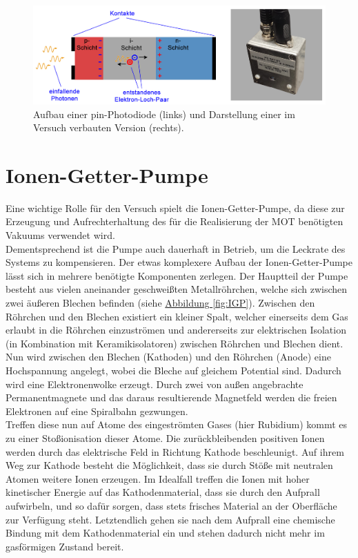 \documentclass[
class=book,
accentcolor=1b,
custommargins=geometry,
fontsize=11pt,
thesis={type=Versuchsanleitung},
ruledheaders=all,
headline=false,
instbox=false,
marginpar=false,
title=small,
ignore-missing-data=true,
twoside=false,
logofile=apqdesign/tuda_logo.pdf,
pdfa=false %
]{apqpub}
\newcommand{\gqq}[1]{\glqq{}#1\grqq{}}
\begin{document}
			\begin{figure}[htb!]
				\centering
				\includegraphics[width=\textwidth]{graphics/PDI.jpg}
				\caption{Aufbau einer pin-Photodiode (links)
					und Darstellung einer im Versuch verbauten Version (rechts).}
				\label{fig:PDI}
			\end{figure}

			\section{Ionen-Getter-Pumpe}			
			Eine wichtige Rolle für den Versuch spielt die Ionen-Getter-Pumpe, da diese zur Erzeugung und Aufrechterhaltung des für die Realisierung der MOT benötigten Vakuums verwendet wird.\\
			Dementsprechend ist die Pumpe auch dauerhaft in Betrieb, um die Leckrate des Systems zu kompensieren. 
			Der etwas komplexere Aufbau der Ionen-Getter-Pumpe lässt sich in mehrere benötigte Komponenten zerlegen. 
			Der Hauptteil der Pumpe besteht aus vielen aneinander geschweißten Metallröhrchen, welche sich zwischen zwei äußeren Blechen befinden (siehe \hyperref[fig:IGP]{Abbildung \ref{fig:IGP}}). 
			Zwischen den Röhrchen und den Blechen existiert ein kleiner Spalt, welcher einerseits dem Gas erlaubt in die Röhrchen einzuströmen und andererseits zur elektrischen Isolation (in Kombination mit Keramikisolatoren) zwischen Röhrchen und Blechen dient. 
			Nun wird zwischen den Blechen (Kathoden) und den Röhrchen (Anode) eine Hochspannung angelegt, wobei die Bleche auf gleichem Potential sind. 
			Dadurch wird eine Elektronenwolke erzeugt. 
			Durch zwei von außen angebrachte Permanentmagnete und das daraus resultierende Magnetfeld werden die freien Elektronen auf eine Spiralbahn gezwungen.\\
			Treffen diese nun auf Atome des eingeströmten Gases (hier Rubidium) kommt es zu einer Stoßionisation dieser Atome. 
			Die zurückbleibenden positiven Ionen werden durch das elektrische Feld in Richtung Kathode beschleunigt. 
			Auf ihrem Weg zur Kathode besteht die Möglichkeit, dass sie durch Stöße mit neutralen Atomen weitere Ionen erzeugen. 
			Im Idealfall treffen die Ionen mit hoher kinetischer Energie auf das Kathodenmaterial, dass sie durch den Aufprall \gqq{aufwirbeln}, und so dafür sorgen, dass stets frisches Material an der Oberfläche zur Verfügung steht. 
			Letztendlich gehen sie nach dem Aufprall eine chemische Bindung mit dem Kathodenmaterial ein und stehen dadurch nicht mehr im gasförmigen Zustand bereit.
			
\end{document}
